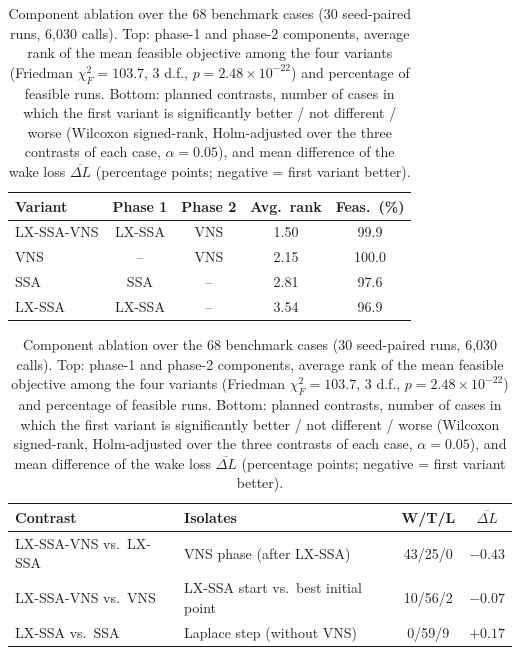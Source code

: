 \begin{table}[!t]
\centering
\caption{Component ablation over the 68 benchmark cases (30 seed-paired runs, 6,030 calls). Top: phase-1 and phase-2 components, average rank of the mean feasible objective among the four variants (Friedman $\chi^2_F=103.7$, 3 d.f., $p=2.48\times10^{-22}$) and percentage of feasible runs. Bottom: planned contrasts, number of cases in which the first variant is significantly better / not different / worse (Wilcoxon signed-rank, Holm-adjusted over the three contrasts of each case, $\alpha=0.05$), and mean difference of the wake loss $\overline{\Delta L}$ (percentage points; negative = first variant better).}
\label{tab:ablation}
\scriptsize\setlength{\tabcolsep}{2.5pt}
\begin{tabular}{lcccc}
\toprule
Variant & Phase 1 & Phase 2 & Avg.\ rank & Feas.\ (\%) \\
\midrule
LX-SSA-VNS & LX-SSA & VNS & 1.50 & 99.9 \\
VNS & -- & VNS & 2.15 & 100.0 \\
SSA & SSA & -- & 2.81 & 97.6 \\
LX-SSA & LX-SSA & -- & 3.54 & 96.9 \\
\bottomrule
\end{tabular}

\smallskip
\begin{tabular}{l>{\raggedright\arraybackslash}p{2.6cm}cc}
\toprule
Contrast & Isolates & W/T/L & $\overline{\Delta L}$ \\
\midrule
LX-SSA-VNS vs.\ LX-SSA & VNS phase (after LX-SSA) & 43/25/0 & $-0.43$ \\
LX-SSA-VNS vs.\ VNS & LX-SSA start vs.\ best initial point & 10/56/2 & $-0.07$ \\
LX-SSA vs.\ SSA & Laplace step (without VNS) & 0/59/9 & $+0.17$ \\
\bottomrule
\end{tabular}
\end{table}
